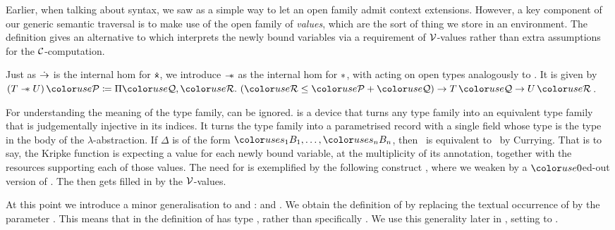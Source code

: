 Earlier, when talking about syntax, we saw  as a simple way
to let an open family admit context extensions.
However, a key component of our generic semantic traversal is to make use of
the open family \AgdaBound{$\V$} of \emph{values}, which are the sort of thing
we store in an environment.
The definition  gives an alternative to
 which interprets the newly bound variables via a
requirement of $\V$-values rather than extra assumptions for the
$\mathcal C$-computation.


Just as $\mathrel{\dot\to}$ is the internal hom for $\dottimes$, we introduce $\mathrel{\mathord{-}\hspace{-0.75ex}*}$ as
the internal hom for $\mathbin{*}$, with  acting on open types
analogously to .
It is given by $\plr{T \wand U}\,\grP \coloneqq
\Pi\grQ,\grR.~\plr{\grR \leq \grP + \grQ} \to T\,\grQ \to U\,\grR$.

For understanding the meaning of the type family,  can be
ignored.
 is a device that turns any type family into an equivalent
type family that is judgementally injective in its indices.
It turns the type family into a parametrised record with a single field
 whose type is the type in the body of the $\lambda$-abstraction.
If $\Delta$ is of the form $\gr{s_1}B_1, \ldots, \gr{s_n}B_n$, then
\ is equivalent to
\ by Currying.
That is to say, the Kripke function is expecting a value for each newly bound
variable, at the multiplicity of its annotation, together with the resources
supporting each of those values.
The need for  is exemplified by the following construct
, where we weaken \AgdaBound{$\Gamma$} by a $\gr0$ed-out
version of \AgdaBound{$\Delta$}.
The \AgdaBound{$\Delta$} then gets filled in by the $\V$-values.

 At this point we introduce a minor generalisation to 
and :
\AgdaSpace{} and
\AgdaSpace{}.
We obtain the definition of \AgdaSpace{}
by replacing the textual occurrence of  by the parameter
.
This means that  in the definition of  has
type , rather than specifically .
We use this generality later in , setting 
to .

